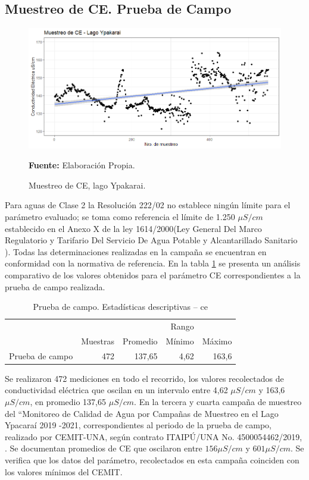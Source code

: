 \subsection{Muestreo de CE. Prueba de Campo}

\begin{figure}[H]
        \centering
        \includegraphics[width=0.75\linewidth]{Imagenes/cap4/CE_lago.png}
        \caption {Muestreo de CE, lago Ypakarai. }{\textbf{Fuente:}
        Elaboraci\'on Propia. }
        \label{fig:Lago_ce}
\end{figure}

Para aguas de Clase 2 la Resoluci\'on 222/02 no establece ningún l\'imite para el par\'ametro evaluado; se toma como referencia el l\'imite de 1.250 $\mu S/cm$ establecido en el Anexo X de la ley 1614/2000(Ley General Del Marco Regulatorio y Tarifario Del Servicio De Agua Potable y Alcantarillado Sanitario \cite{ministerio_de_hacienda_ley_nodate}). Todas las determinaciones realizadas en la campa\~na se encuentran en conformidad con la normativa de referencia.
En la tabla \ref{table:Lago_ce} se presenta un an\'alisis comparativo de los valores obtenidos para el par\'ametro CE correspondientes a la prueba de campo  realizada.

\begin{table}[H]
\centering
\caption{Prueba de campo. Estadísticas descriptivas – ce}
\label{table:Lago_ce}
\begin{tabular}{lrrrr}
\toprule& 
\multicolumn{3}{r}{Rango} \\  \cline{4-5}& 
Muestras & Promedio & Mínimo & Máximo \\
\midrule
Prueba de campo  &      472 &   137,65 &   4,62 &  163,6 \\
\bottomrule
\end{tabular}
\end{table}

Se realizaron 472 mediciones en todo el recorrido, los valores recolectados de conductividad el\'ectrica que oscilan en  un intervalo entre 4,62 $\mu S/cm$ y 163,6 $\mu S/cm$, en promedio 137,65 $\mu S/cm$.
En la tercera y cuarta campaña de muestreo del “Monitoreo de Calidad de Agua por Campañas de Muestreo en el Lago Ypacaraí 2019 -2021, correspondientes al periodo de la prueba de campo, realizado por CEMIT-UNA, seg\'un contrato ITAIPÚ/UNA No. 4500054462/2019, \cite{3er_Cemit}\cite{4to_Cemit}. Se documentan promedios de CE que oscilaron entre $156 \mu S/cm$ y $601 \mu S/cm$. 
Se verifica que los datos del par\'ametro, recolectados en esta campa\~na coinciden con los valores mínimos del CEMIT.

